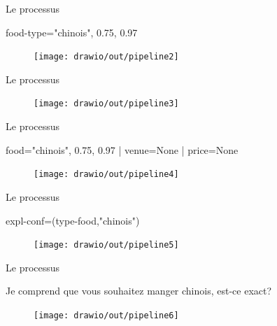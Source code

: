 \documentclass[french]{beamer}
\begin{document}
    \begin{frame}{Le processus}
        \begin{block}{}
            food-type="chinois", 0.75, 0.97
        \end{block}
        \begin{figure}
            \centering
            \texttt{[image: drawio/out/pipeline2]}
        \end{figure}
    \end{frame}



    \begin{frame}{Le processus}
        \begin{block}{  }
        \end{block}
        \begin{figure}
            \centering
            \texttt{[image: drawio/out/pipeline3]}
        \end{figure}
    \end{frame}


    \begin{frame}{Le processus}
        \begin{block}{  }
            food="chinois", 0.75, 0.97 | venue=None | price=None
        \end{block}
        \begin{figure}
            \centering
            \texttt{[image: drawio/out/pipeline4]}
        \end{figure}
    \end{frame}


    \begin{frame}{Le processus}
        \begin{block}{}
            expl-conf=(type-food,"chinois")
        \end{block}
        \begin{figure}
            \centering
            \texttt{[image: drawio/out/pipeline5]}
        \end{figure}
    \end{frame}

    \begin{frame}{Le processus}
        \begin{block}{}
            Je comprend que vous souhaitez manger chinois, est-ce exact?
        \end{block}
        \begin{figure}
            \centering
            \texttt{[image: drawio/out/pipeline6]}
        \end{figure}
    \end{frame}
\end{document}
